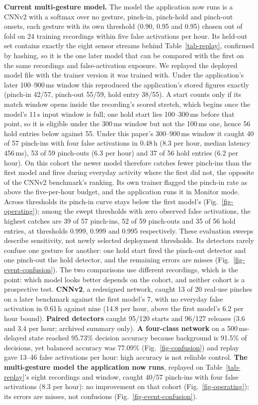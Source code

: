 \textbf{Current multi-gesture model.} The model the application now runs is a CNNv2 with a softmax over no gesture, pinch-in, pinch-hold and pinch-out onsets, each gesture with its own threshold (0.90, 0.95 and 0.95) chosen out of fold on 24 training recordings within five false activations per hour. Its held-out set contains exactly the eight sensor streams behind Table~\ref{tab-replay}, confirmed by hashing, so it is the one later model that can be compared with the first on the same recordings and false-activation exposure. We replayed the deployed model file with the trainer version it was trained with. Under the application's later 100--900\,ms window this reproduced the application's stored figures exactly (pinch-in 42/57, pinch-out 55/59, hold entry 38/55). A start counts only if its match window opens inside the recording's scored stretch, which begins once the model's 11\,s input window is full; one hold start lies 100--300\,ms before that point, so it is eligible under the 300\,ms window but not the 100\,ms one, hence 56 hold entries below against 55. Under this paper's 300--900\,ms window it caught 40 of 57 pinch-ins with four false activations in 0.48\,h (8.3 per hour, median latency 456\,ms), 53 of 59 pinch-outs (6.3 per hour) and 37 of 56 hold entries (6.2 per hour). On this cohort the newer model therefore catches fewer pinch-ins than the first model and fires during everyday activity where the first did not, the opposite of the CNNv2 benchmark's ranking. Its own trainer flagged the pinch-in rate as above the five-per-hour budget, and the application runs it in Monitor mode. Across thresholds its pinch-in curve stays below the first model's (Fig.~\ref{fig-operating}); among the swept thresholds with zero observed false activations, the highest catches are 39 of 57 pinch-ins, 52 of 59 pinch-outs and 35 of 56 hold entries, at thresholds 0.999, 0.999 and 0.995 respectively. These evaluation sweeps describe sensitivity, not newly selected deployment thresholds. Its detectors rarely confuse one gesture for another: one hold start fired the pinch-out detector and one pinch-out the hold detector, and the remaining errors are misses (Fig.~\ref{fig-event-confusion}). The two comparisons use different recordings, which is the point: which model looks better depends on the cohort, and neither cohort is a prospective test.
\else
\textbf{CNNv2}, a redesigned network, caught 13 of 20 real-use pinches on a later benchmark against the first model's 7, with no everyday false activation in 0.61\,h against nine (14.8 per hour, above the first model's 6.2 per hour bound). \textbf{Paired detectors} caught 95/120 starts and 96/127 releases (3.6 and 3.4 per hour; archived summary only). \textbf{A four-class network} on a 500\,ms-delayed state reached 95.73\% decision accuracy because background is 91.5\% of decisions, yet balanced accuracy was 77.09\%\ifmorefigures{} (Fig.~\ref{fig-confusion})\fi{} and replay gave 13--46 false activations per hour: high accuracy is not reliable control. \textbf{The multi-gesture model the application now runs}, replayed on Table~\ref{tab-replay}'s eight recordings and window, caught 40/57 pinch-ins with four false activations (8.3 per hour): no improvement on that cohort (Fig.~\ref{fig-operating}); its errors are misses, not confusions (Fig.~\ref{fig-event-confusion}).
